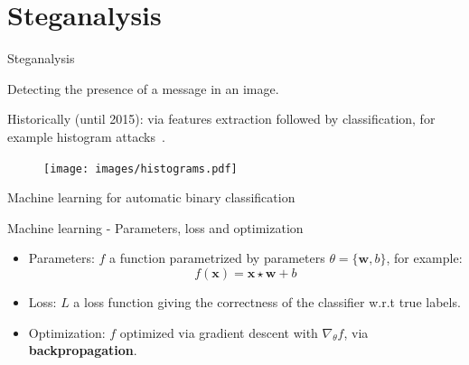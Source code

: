\documentclass[10pt,aspectratio=169]{beamer}
\newcommand{\grad}{\nabla}
\begin{document}


\section*{Steganalysis}


\begin{frame}{Steganalysis}


\begin{center}
    \alert{Detecting the presence of a message in an image.}
\end{center}

\pause

Historically (until 2015): via features extraction followed by classification, for example histogram attacks~.

\begin{figure}
        \texttt{[image: images/histograms.pdf]}
\end{figure}

\end{frame}

\begin{frame}{Machine learning for automatic binary classification}
\end{frame}

\begin{frame}{Machine learning - Parameters, loss and optimization}

\begin{itemize}
    \setlength\itemsep{2em}

        \item \alert{Parameters}: $f$ a function parametrized by parameters $\theta = \{\mathbf{w}, b \}$, for example:
            \begin{equation}
                f(\mathbf{x}) = \mathbf{x} \star \mathbf{w} + b
            \end{equation}

        \pause
        \item \alert{Loss}: $L$ a loss function giving the correctness of the classifier w.r.t true labels.

        \pause
        \item \alert{Optimization}: $f$ optimized via gradient descent with $\grad_\theta f$, via \textbf{backpropagation}.
            
    \end{itemize}

\end{frame}
\end{document}
